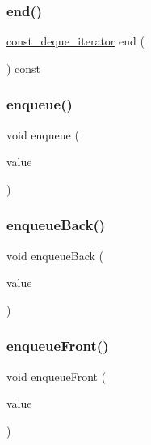 \mbox{\label{classDeque_a255e9712f118c564977def0bdb6438a2}} 
\subsubsection{\texorpdfstring{end()}{end()}\hspace{0.1cm}{\footnotesize\ttfamily [2/2]}}
{\footnotesize\ttfamily \mbox{\hyperlink{classDeque_1_1const__deque__iterator}{const\+\_\+deque\+\_\+iterator}} end (\begin{DoxyParamCaption}{ }\end{DoxyParamCaption}) const\hspace{0.3cm}{\ttfamily [inline]}}

\mbox{\label{classDeque_a663f69ed5d98f3f167202e9b2d7e7a9a}} 
\subsubsection{\texorpdfstring{enqueue()}{enqueue()}}
{\footnotesize\ttfamily void enqueue (\begin{DoxyParamCaption}\item[{const Value\+Type \&}]{value }\end{DoxyParamCaption})}

\mbox{\label{classDeque_a2fdd7308cc72a3bd03dd6345ef778a65}} 
\subsubsection{\texorpdfstring{enqueue\+Back()}{enqueueBack()}}
{\footnotesize\ttfamily void enqueue\+Back (\begin{DoxyParamCaption}\item[{const Value\+Type \&}]{value }\end{DoxyParamCaption})}

\mbox{\label{classDeque_a12586c9fec2e0dd724cf6ccb4d52c6e8}} 
\subsubsection{\texorpdfstring{enqueue\+Front()}{enqueueFront()}}
{\footnotesize\ttfamily void enqueue\+Front (\begin{DoxyParamCaption}\item[{const Value\+Type \&}]{value }\end{DoxyParamCaption})}

